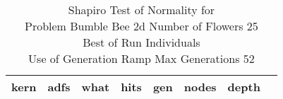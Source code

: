 \begin{table}[H]
\caption{Shapiro Test of Normality for \\ Problem  Bumble Bee 2d  Number of Flowers 25\\Best of Run Individuals \\ Use of Generation Ramp  Max Generations 52\\}
\begin{center}
\scalebox{0.8} %
{
\begin{tabular}{lrrrrrrr}
\hline
kern & adfs & what & hits & gen & nodes & depth \\
\hline


\end{tabular}
}
\end{center}
\end{table}

